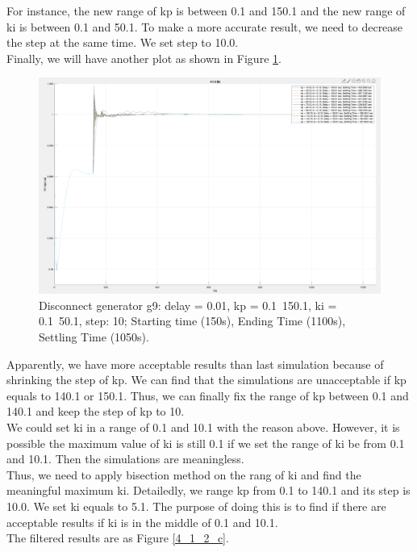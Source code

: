 \documentclass{report}
\begin{document}
For instance, the new range of kp is between 0.1 and 150.1 and the new range of ki is between 0.1 and 50.1. To make a more accurate result, we need to decrease the step at the same time. We set step to 10.0. \\

Finally, we will have another plot as shown in Figure \textcolor{red}{\ref{4_1_2_b}}. \\

\begin{figure}[htbp]
\centering
\includegraphics[width = .819\textwidth]{figure/4_1_2_b.png}
\caption{Disconnect generator g9: delay = 0.01, kp = 0.1~150.1, ki = 0.1~50.1, step: 10; Starting time (150s), Ending Time (1100s), Settling Time (1050s).}
\label{4_1_2_b}
\end{figure}


Apparently, we have more acceptable results than last simulation because of shrinking the step of kp. We can find that the simulations are unacceptable if kp equals to 140.1 or 150.1. Thus, we can finally fix the range of kp between 0.1 and 140.1 and keep the step of kp to 10. \\

We could set ki in a range of 0.1 and 10.1 with the reason above. However, it is possible the maximum value of ki is still 0.1 if we set the range of ki be from 0.1 and 10.1. Then the simulations are meaningless. \\

Thus, we need to apply bisection method on the rang of ki and find the meaningful maximum ki. Detailedly, we range kp from 0.1 to 140.1 and its step is 10.0. We set ki equals to 5.1. The purpose of doing this is to find if there are acceptable results if ki is in the middle of 0.1 and 10.1.\\   

The filtered results are as Figure \textcolor{red}{\ref{4_1_2_c}}. \\
\end{document}
